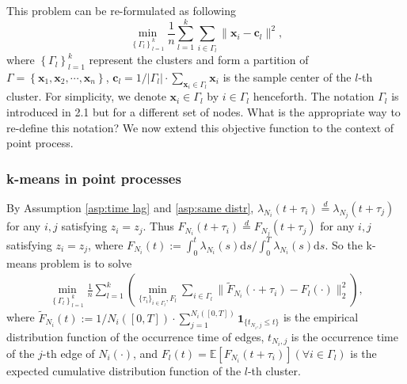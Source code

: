 			
			This problem can be re-formulated as following 
			\begin{equation}\label{eq:kmeans}
			\min_{\left\{ \Gamma_l \right\}_{l=1}^k}\frac{1}{n}\sum_{l=1}^k\sum_{i\in {\Gamma}_l} \|\mathbf{x}_i- \mathbf{c}_l\|^2,
			\end{equation}
			where $\left\{ \Gamma_l \right\}_{l=1}^k$ represent the clusters and form a partition of $\Gamma = \left\{ \mathbf{x}_1,\mathbf{x}_2,\cdots,\mathbf{x}_n \right\}$,
			$\mathbf{c}_l = {1}/{|\Gamma_l|}\cdot\sum_{\mathbf{x}_i\in \Gamma_l}\mathbf{x}_i$ is the sample center of the $l$-th cluster. 
			For simplicity, we denote $\mathbf{x}_i\in \Gamma_l$ by $i\in\Gamma_l$ henceforth.
			{\color{red} The notation $\Gamma_l$ is introduced in 2.1 but for a different set of nodes. What is the appropriate way to re-define this notation?}
			We now extend this objective function to the context of point process.
		
		\subsubsection*{k-means in point processes}
			By Assumption \ref{asp:time lag} and \ref{asp:same distr}, 
			$\lambda_{N_i}(t+\tau_i)\overset{d}{=}\lambda_{N_j}(t+\tau_j)$ for any $i,j$ satisfying $z_i=z_j$. Thus $F_{N_i}(t+\tau_i)\overset{d}{=}F_{N_j}(t+\tau_j)$ for any $i,j$ satisfying $z_i=z_j$, 
			where 
			$F_{N_i}(t):=\int_0^t\lambda_{N_i}(s)\text{d}s\big/\int_0^T\lambda_{N_i}(s)\text{d}s$.
			So the k-means problem is to solve
			\begin{align}\label{eq:kmeans_F}
			\min_{\left\{ \Gamma_l \right\}_{l=1}^k} \frac{1}{n} \sum_{l=1}^k \left(\min_{\{\tau_i\}_{i\in\Gamma_l},F_l} \sum_{i\in\Gamma_l} \| \tilde{F}_{N_i}(\cdot+\tau_i)- F_l(\cdot)\|_2^2 \right),
			\end{align}
			where 
			$\tilde{F}_{N_i}(t):=1/{N_i([0,T])}\cdot\sum_{j=1}^{N_i([0,T])}\mathbf{1}_{\{t_{N_i,j}\leq t\}}$ is the empirical distribution function of the occurrence time of edges,
			$t_{N_i,j}$ is the occurrence time of the $j$-th edge of $N_i(\cdot)$,
			and $F_l(t)=\mathbb{E}[F_{N_i}(t+\tau_i)] (\forall i\in\Gamma_l)$ is the expected cumulative distribution function of the $l$-th cluster.



